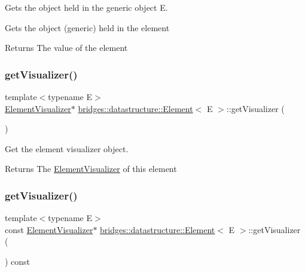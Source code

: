 Gets the object held in the generic object E. 

Gets the object (generic) held in the element \begin{DoxyReturn}{Returns}
The value of the element 
\end{DoxyReturn}
\mbox{\label{classbridges_1_1datastructure_1_1_element_ad4f9ca479938bacd4586df8e7ede2116}} 
\subsubsection{\texorpdfstring{get\+Visualizer()}{getVisualizer()}\hspace{0.1cm}{\footnotesize\ttfamily [1/2]}}
{\footnotesize\ttfamily template$<$typename E$>$ \\
\hyperlink{classbridges_1_1datastructure_1_1_element_visualizer}{Element\+Visualizer}$\ast$ \hyperlink{classbridges_1_1datastructure_1_1_element}{bridges\+::datastructure\+::\+Element}$<$ E $>$\+::get\+Visualizer (\begin{DoxyParamCaption}{ }\end{DoxyParamCaption})\hspace{0.3cm}{\ttfamily [inline]}}



Get the element visualizer object. 

\begin{DoxyReturn}{Returns}
The \hyperlink{classbridges_1_1datastructure_1_1_element_visualizer}{Element\+Visualizer} of this element 
\end{DoxyReturn}
\mbox{\label{classbridges_1_1datastructure_1_1_element_a75a7770c3b6b1a6cd826293ea33d2d0a}} 
\subsubsection{\texorpdfstring{get\+Visualizer()}{getVisualizer()}\hspace{0.1cm}{\footnotesize\ttfamily [2/2]}}
{\footnotesize\ttfamily template$<$typename E$>$ \\
const \hyperlink{classbridges_1_1datastructure_1_1_element_visualizer}{Element\+Visualizer}$\ast$ \hyperlink{classbridges_1_1datastructure_1_1_element}{bridges\+::datastructure\+::\+Element}$<$ E $>$\+::get\+Visualizer (\begin{DoxyParamCaption}{ }\end{DoxyParamCaption}) const\hspace{0.3cm}{\ttfamily [inline]}}



